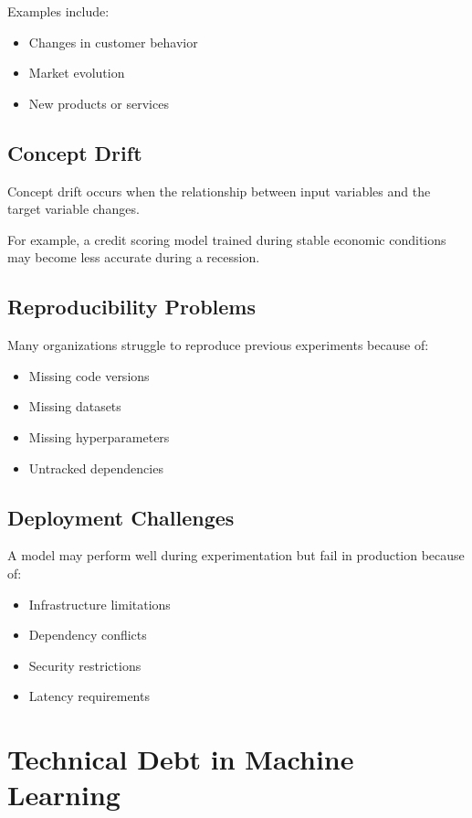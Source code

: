 Examples include:

\begin{itemize}
    \item Changes in customer behavior
    \item Market evolution
    \item New products or services
\end{itemize}

\subsection{Concept Drift}

Concept drift occurs when the relationship between input variables and the target variable changes.

For example, a credit scoring model trained during stable economic conditions may become less accurate during a recession.

\subsection{Reproducibility Problems}

Many organizations struggle to reproduce previous experiments because of:

\begin{itemize}
    \item Missing code versions
    \item Missing datasets
    \item Missing hyperparameters
    \item Untracked dependencies
\end{itemize}

\subsection{Deployment Challenges}

A model may perform well during experimentation but fail in production because of:

\begin{itemize}
    \item Infrastructure limitations
    \item Dependency conflicts
    \item Security restrictions
    \item Latency requirements
\end{itemize}

\section{Technical Debt in Machine Learning}

